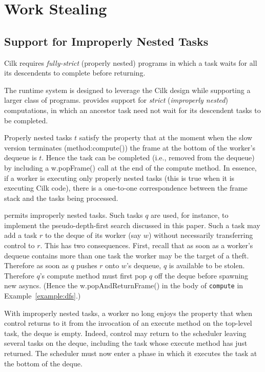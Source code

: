 \section{\Xten{} Work Stealing}\label{sec:XWS}

\subsection{Support for Improperly Nested Tasks}
Cilk requires {\em fully-strict} (properly nested) programs in which a
task waits for all its descendents to complete before returning.

The \Xten{} runtime system is designed to leverage the Cilk design
while supporting a larger class of programs. \Xten{} provides support
for {\em strict} ({\em improperly nested}) computations, in which an
ancestor task need not wait for its descendent tasks to be completed.

Properly nested tasks $t$ satisfy the property that at the moment when
the slow version terminates (method:{\java compute()}) the frame at
the bottom of the worker's dequeue is $t$. Hence the task can be
completed (i.e., removed from the dequeue) by including a {\java
w.popFrame()} call at the end of the compute method. In essence, if a
worker is executing only properly nested tasks (this is true when it
is executing Cilk code), there is a one-to-one correspondence between
the frame stack and the tasks being processed.

\Xten{} permits improperly nested tasks. Such tasks $q$ are used, for
instance, to implement the pseudo-depth-first search discussed in this
paper. Such a task may add a task $r$ to the deque of its worker (say
$w$) without necessarily transferring control to $r$. This has two
consequences. First, recall that as soon as a worker's dequeue
contains more than one task the worker may be the target of a
theft. Therefore as soon as $q$ pushes $r$ onto $w$'s dequeue, $q$ is
available to be stolen.  Therefore $q$'s compute method must first pop
$q$ off the deque before spawning new asyncs. (Hence the {\java
w.popAndReturnFrame()} in the body of {\tt compute} in
Example~\ref{example:dfs}.)

With improperly nested tasks, a worker no long enjoys the property
that when control returns to it from the invocation of an execute
method on the top-level task, the deque is empty. Indeed, control may
return to the scheduler leaving several tasks on the deque, including
the task whose execute method has just returned. The scheduler must
now enter a phase in which it executes the task at the bottom of the
deque.

